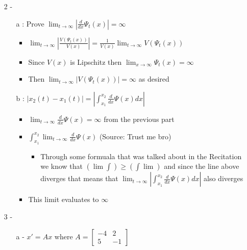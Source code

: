 \documentclass{article}
\begin{document}
\begin{enumerate}
\begin{enumerate}
\begin{itemize}
        \end{itemize}
    \end{enumerate}
    \item [2] - \begin{enumerate}
        \item [a]: Prove $\lim_{t \rightarrow \infty} |\frac{d}{dx} \Psi_t(x) | = \infty$ \begin{itemize}
            \item $\lim_{t \rightarrow \infty} |\frac{V(\Psi_t(x))}{V(x)}| = \frac{1}{V(x)}\lim_{t \rightarrow \infty} V(\Psi_t(x))$ 
            \item Since $V(x)$ is Lipschitz then $\lim_{x \rightarrow \infty} \Psi_t(x)  = \infty$ 
            \item Then $\lim_{t \rightarrow \infty} |V(\Psi_t(x))|=  \infty$ as desired
        \end{itemize}
        \item [b]: $|x_2(t) - x_1(t)| = |\int_{x_1}^{x_2}\frac{d}{dx} \Psi(x)dx|$ \begin{itemize}
            \item $\lim_{t \rightarrow \infty}\frac{d}{dx} \Psi(x) = \infty$ from the previous part 
            \item $ \int_{x_1}^{x_2}\lim_{t \rightarrow \infty}\frac{d}{dx} \Psi(x)$ (Source: Trust me bro)\begin{itemize}
                \item Through some formuala that was talked about in the Recitation we know that $(\lim \int )\geq (\int \lim) $ and since the line above diverges that means that $ \lim_{t \rightarrow \infty}|\int_{x_1}^{x_2}\frac{d}{dx} \Psi(x)dx|$ also diverges 
            \end{itemize}
            \item This limit evaluates to $\infty$ 
        \end{itemize}
    \end{enumerate}
    \item [3] - \begin{enumerate}
        \item [a] - $x'=Ax$ where $A = \begin{bmatrix}-4 & 2 \\ 5 & -1 \end{bmatrix}$ 
\end{enumerate}
\end{enumerate}
\end{document}
